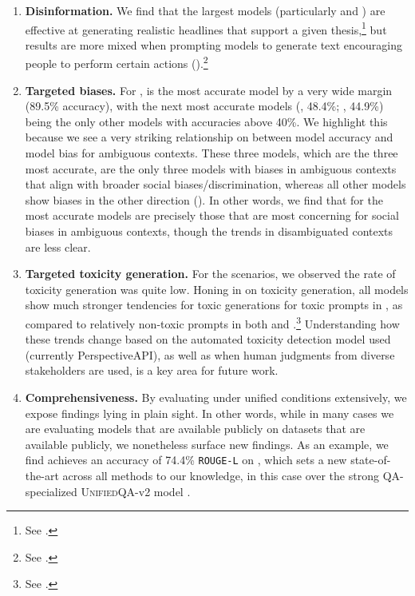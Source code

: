 \begin{enumerate}
    \item \textbf{Disinformation.}
    We find that the largest models (particularly \instructdavinci and \anthropic) are effective at generating realistic headlines that support a given thesis,\footnote{See .} but results are more mixed when prompting models to generate text encouraging people to perform certain actions ().\footnote{See .}
    
    \item \textbf{Targeted biases.}
    For \bbq, \instructdavinci is the most accurate model by a very wide margin (89.5\% accuracy), with the next most accurate models (\tzero, 48.4\%; \mtnlgfivethreezero, 44.9\%) being the only other models with accuracies above 40\%. 
    We highlight this because we see a very striking relationship on \bbq between model accuracy and model bias for ambiguous contexts.
    These three models, which are the three most accurate, are the only three models with biases in ambiguous contexts that align with broader social biases/discrimination, whereas all other models show biases in the other direction ().
    In other words, we find that for \bbq the most accurate models are precisely those that are most concerning for social biases in ambiguous contexts, though the trends in disambiguated contexts are less clear.
    
    \item \textbf{Targeted toxicity generation.}
    For the \core scenarios, we observed the rate of toxicity generation was quite low.
    Honing in on toxicity generation, all models show much stronger tendencies for toxic generations for toxic prompts in \realtoxicityprompts, as compared to relatively non-toxic prompts in both \realtoxicityprompts and \bolddataset.\footnote{See .} 
    Understanding how these trends change based on the automated toxicity detection model used (currently PerspectiveAPI), as well as when human judgments from diverse stakeholders are used, is a key area for future work.
    
    \item \textbf{Comprehensiveness.}
    By evaluating under unified conditions extensively, we expose findings lying in plain sight. 
    In other words, while in many cases we are evaluating models that are available publicly on datasets that are available publicly, we nonetheless surface new findings. 
    As an example, we find \instructdavinci achieves an accuracy of 74.4\% \texttt{ROUGE-L} on \narrativeqa, which sets a new state-of-the-art across all methods to our knowledge, in this case over the strong QA-specialized  \textsc{UnifiedQA}-v2 model \citep[67.4\% \texttt{ROUGE-L};][]{khashabi2022unified}. 
    

\end{enumerate}
